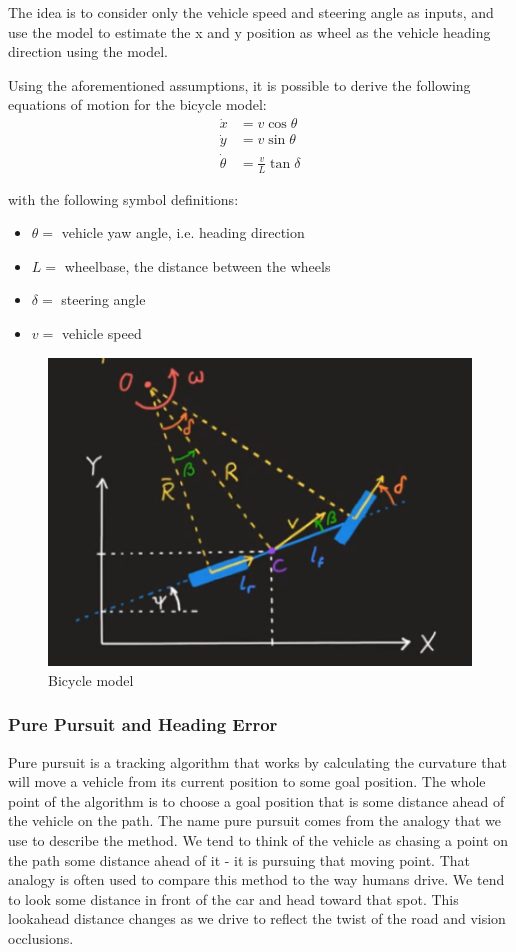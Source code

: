 \documentclass[a4paper,12pt,sort&compress]{article}
\begin{document}
    The idea is to consider only the vehicle speed and steering angle as inputs,
    and use the model to estimate the x and y position as wheel as the vehicle
    heading direction using the model.

    Using the aforementioned assumptions, it is possible to derive the following
    equations of motion for the bicycle model:
    \begin{align} 
        \dot{x} &= v \cos \theta \\
        \dot{y} &= v \sin \theta \\
        \dot{\theta} &= \frac{v}{L} \tan \delta
    \end{align}

    with the following symbol definitions:
    \begin{itemize} 
        \item $\theta =$ vehicle yaw angle, i.e. heading direction
        \item $L =$ wheelbase, the distance between the wheels
        \item $\delta =$ steering angle
        \item $v =$ vehicle speed
    \end{itemize}

    \begin{figure}
        \centering
        \includegraphics[width=0.8\linewidth]{bicycle_model.png}
        \caption{Bicycle model}
        \label{fig:bicycle_model}
    \end{figure}

    \subsubsection{Pure Pursuit and Heading Error}
    Pure pursuit is a tracking algorithm that works by calculating the curvature that will move a vehicle
    from its current position to some goal position. The whole point of the algorithm is to choose a goal
    position that is some distance ahead of the vehicle on the path. The name pure pursuit comes from
    the analogy that we use to describe the method. We tend to think of the vehicle as chasing a point
    on the path some distance ahead of it - it is pursuing that moving point. That analogy is often used
    to compare this method to the way humans drive. We tend to look some distance in front of the car
    and head toward that spot. This lookahead distance changes as we drive to reflect the twist of the
    road and vision occlusions\cite{coulter1992implementation}.
\end{document}
